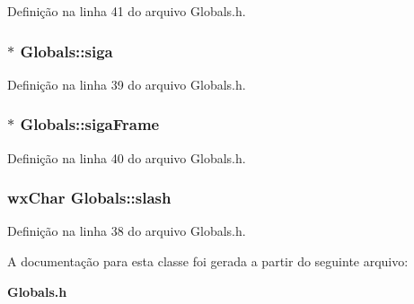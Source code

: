 Definição na linha 41 do arquivo Globals.\+h.

\subsubsection[{siga}]{$\ast$ Globals\+::siga\hspace{0.3cm}{\ttfamily [static]}}\label{class_globals_aa03c97daabcfd2348ff64553502ba8ba}


Definição na linha 39 do arquivo Globals.\+h.

\subsubsection[{siga\+Frame}]{$\ast$ Globals\+::siga\+Frame\hspace{0.3cm}{\ttfamily [static]}}\label{class_globals_a430bee2b3002a3adf70605a200f3373e}


Definição na linha 40 do arquivo Globals.\+h.

\subsubsection[{slash}]{\setlength{\rightskip}{0pt plus 5cm}wx\+Char Globals\+::slash\hspace{0.3cm}{\ttfamily [static]}}\label{class_globals_ad2692c08dcf94db8d443876527c0b3a8}


Definição na linha 38 do arquivo Globals.\+h.



A documentação para esta classe foi gerada a partir do seguinte arquivo\+:\begin{DoxyCompactItemize}
\item 
{\bf Globals.\+h}\end{DoxyCompactItemize}
